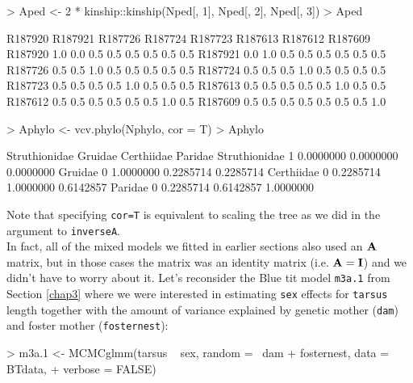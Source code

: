 \documentclass{article}
\begin{document}
\begin{Schunk}
\begin{Sinput}
> Aped <- 2 * kinship::kinship(Nped[, 1], Nped[, 2], Nped[, 3])
> Aped
\end{Sinput}
\begin{Soutput}
        R187920 R187921 R187726 R187724 R187723 R187613 R187612 R187609
R187920     1.0     0.0     0.5     0.5     0.5     0.5     0.5     0.5
R187921     0.0     1.0     0.5     0.5     0.5     0.5     0.5     0.5
R187726     0.5     0.5     1.0     0.5     0.5     0.5     0.5     0.5
R187724     0.5     0.5     0.5     1.0     0.5     0.5     0.5     0.5
R187723     0.5     0.5     0.5     0.5     1.0     0.5     0.5     0.5
R187613     0.5     0.5     0.5     0.5     0.5     1.0     0.5     0.5
R187612     0.5     0.5     0.5     0.5     0.5     0.5     1.0     0.5
R187609     0.5     0.5     0.5     0.5     0.5     0.5     0.5     1.0
\end{Soutput}
\end{Schunk}

\begin{Schunk}
\begin{Sinput}
> Aphylo <- vcv.phylo(Nphylo, cor = T)
> Aphylo
\end{Sinput}
\begin{Soutput}
              Struthionidae   Gruidae Certhiidae   Paridae
Struthionidae             1 0.0000000  0.0000000 0.0000000
Gruidae                   0 1.0000000  0.2285714 0.2285714
Certhiidae                0 0.2285714  1.0000000 0.6142857
Paridae                   0 0.2285714  0.6142857 1.0000000
\end{Soutput}
\end{Schunk}

Note that specifying \texttt{cor=T} is equivalent to scaling the tree as we did in the argument to \texttt{inverseA}.\\

In fact, all of the mixed models we fitted in earlier sections also used an ${\bf A}$ matrix, but in those cases the matrix was an identity matrix (i.e. ${\bf A}={\bf I}$) and we didn't have to worry about it. Let's reconsider the Blue tit model \texttt{m3a.1} from Section \ref{chap3} where we were interested in estimating \texttt{sex} effects for \texttt{tarsus} length together with the amount of variance explained by genetic mother (\texttt{dam}) and  foster mother  (\texttt{fosternest}):

\begin{Schunk}
\begin{Sinput}
> m3a.1 <- MCMCglmm(tarsus ~ sex, random = ~dam + fosternest, data = BTdata, 
+     verbose = FALSE)
\end{Sinput}
\end{Schunk}
\end{document}
